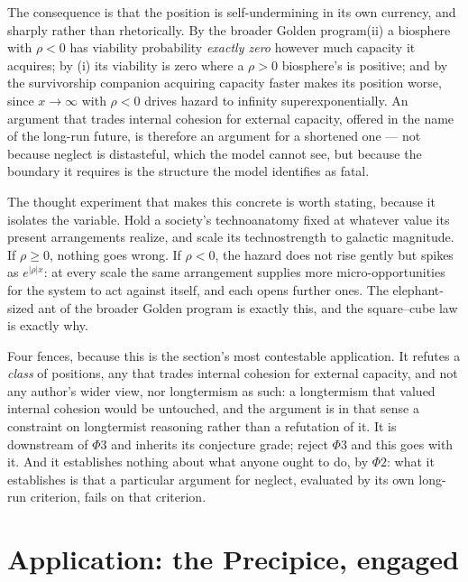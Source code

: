 The consequence is that the position is self-undermining in its own
currency, and sharply rather than rhetorically. By
the broader Golden program(ii) a biosphere with $\rho<0$ has
viability probability \emph{exactly zero} however much capacity it
acquires; by (i) its viability is zero where a $\rho>0$ biosphere's is
positive; and by
the survivorship companion \cite{GoldenSurvivorship} acquiring capacity faster makes its
position worse, since $x\to\infty$ with $\rho<0$ drives hazard to
infinity superexponentially. An argument that trades internal cohesion
for external capacity, offered in the name of the long-run future, is
therefore an argument for a shortened one --- not because neglect is
distasteful, which the model cannot see, but because the boundary it
requires is the structure the model identifies as fatal.

The thought experiment that makes this concrete is worth stating,
because it isolates the variable. Hold a society's technoanatomy fixed
at whatever value its present arrangements realize, and scale its
technostrength to galactic magnitude. If $\rho\ge0$, nothing goes
wrong. If $\rho<0$, the hazard does not rise gently but spikes as
$e^{|\rho|x}$: at every scale the same arrangement supplies more
micro-opportunities for the system to act against itself, and each
opens further ones. The elephant-sized ant of
the broader Golden program is exactly this, and the square--cube
law is exactly why.

Four fences, because this is the section's most contestable
application. It refutes a \emph{class} of positions, any that trades
internal cohesion for external capacity, and not any author's wider
view, nor longtermism as such: a longtermism that valued internal
cohesion would be untouched, and the argument is in that sense a
constraint on longtermist reasoning rather than a refutation of it. It is downstream of $\Phi3$ and inherits its conjecture grade;
reject $\Phi3$ and this goes with it. And it establishes nothing about
what anyone ought to do, by $\Phi2$: what it establishes is that a
particular argument for neglect, evaluated by its own long-run
criterion, fails on that criterion.


\section{Application: the Precipice, engaged}\label{sec:precipice}

\label{gc:subsub:precipice}


